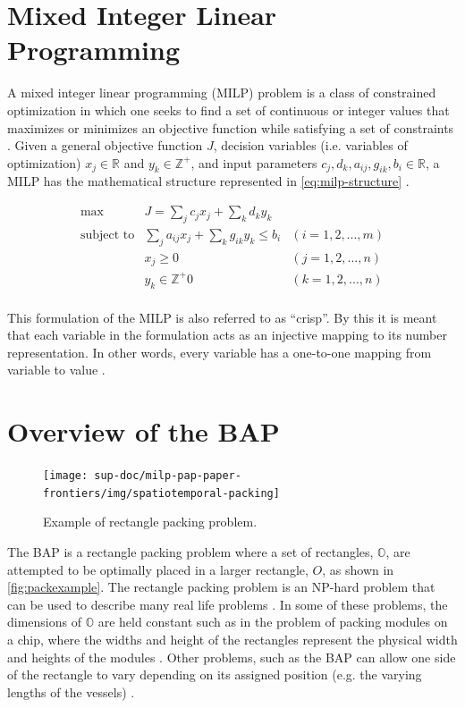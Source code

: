 \documentclass[ee,msthesis]{usuthesis}
\begin{document}
\section{Mixed Integer Linear Programming}
\label{sec:orge0c652a}

A mixed integer linear programming (MILP) problem is a class of constrained optimization in which one seeks to find a
set of continuous or integer values that maximizes or minimizes an objective function while satisfying a set of
constraints \cite{chen-2010-applied}. Given a general objective function \(J\), decision variables (i.e. variables of
optimization) \(x_j \in \mathbb{R}\) and \(y_k \in \mathbb{Z}^+\), and input parameters \(c_j, d_k, a_{ij}, g_{ik}, b_i \in \mathbb{R}\), a MILP has the
mathematical structure represented in \ref{eq:milp-structure} \cite{chen-2010-applied}.

\begin{equation}
\label{eq:milp-structure}
\begin{array}{lll}
\text{max}   & J = \sum_j c_j x_j + \sum_k d_k y_k            &                 \\
\text{subject to} & \sum_j a_{ij} x_j + \sum_k g_{ik} y_k  \le b_i & (i = 1,2,...,m) \\
                  & x_j \ge 0                                      & (j = 1,2,...,n) \\
                  & y_k \in \mathbb{Z^+}0                          & (k = 1,2,...,n) \\
\end{array}
\end{equation}

This formulation of the MILP is also referred to as ``crisp''. By this it is meant that each variable in the formulation
acts as an injective mapping to its number representation. In other words, every variable has a one-to-one mapping from
variable to value \cite{kaur-2016-introd-fuzzy}.

\section{Overview of the BAP}
\label{sec:overview-of-the-bap}
\begin{figure}
  \centering
  \texttt{[image: sup-doc/milp-pap-paper-frontiers/img/spatiotemporal-packing]}
  \caption{Example of rectangle packing problem.}
  \label{fig:bap}
\end{figure}

The BAP is a rectangle packing problem where a set of rectangles, \(\mathbb{O}\), are attempted to be optimally placed in
a larger rectangle, \(O\), as shown in \autoref{fig:packexample}. The rectangle packing problem is an NP-hard problem that
can be used to describe many real life problems \cite{bruin-2013-rectan-packin,murata-1995-rectan}. In some of these
problems, the dimensions of \(\mathbb{O}\) are held constant such as in the problem of packing modules on a chip, where
the widths and height of the rectangles represent the physical width and heights of the modules
\cite{murata-1995-rectan}. Other problems, such as the BAP can allow one side of the rectangle to vary depending on its
assigned position (e.g. the varying lengths of the vessels) \cite{buhrkal-2011-model-discr}.
\end{document}
